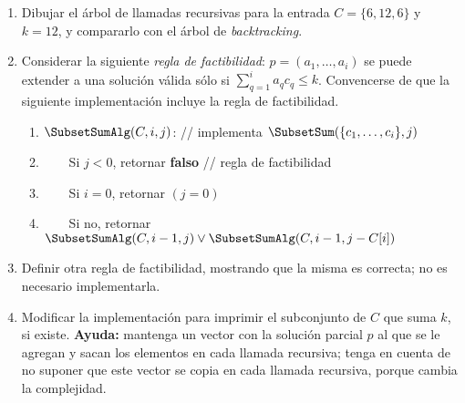 \begin{enumerate}[label=$\alph*)$,ref=$\alph*)$]
 \item Dibujar el árbol de llamadas recursivas para la entrada $C = \{6, 12, 6\}$ y $k = 12$, y compararlo con el árbol de \textit{backtracking}.
 \item Considerar la siguiente \emph{regla de factibilidad}: $p = (a_1, \ldots, a_i)$ se puede extender a una solución válida sólo si $\sum_{q=1}^i a_q c_q \leq k$.  Convencerse de que la siguiente implementación incluye la regla de factibilidad.

  \begin{enumerate}
  \item $\SubsetSumAlg(C, i, j)$: // implementa $\SubsetSum(\{c_1, \ldots, c_i\}, j)$
  \item ~~~~Si $j < 0$, retornar \textbf{falso} // regla de factibilidad
  \item ~~~~Si $i = 0$, retornar $(j = 0)$
  \item ~~~~Si no, retornar $\SubsetSumAlg(C, i-1, j) \lor \SubsetSumAlg(C, i-1, j - C[i])$
 \end{enumerate}

 \item Definir otra regla de factibilidad, mostrando que la misma es correcta; no es necesario implementarla.
 \item Modificar la implementación para imprimir el subconjunto de $C$ que suma $k$, si existe. \textbf{Ayuda:} mantenga un vector con la solución parcial $p$ al que se le agregan y sacan los elementos en cada llamada recursiva; tenga en cuenta de no suponer que este vector se copia en cada llamada recursiva, porque cambia la complejidad.
\end{enumerate}
